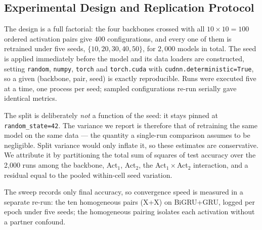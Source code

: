 \documentclass[conference,a4paper]{IEEEtran}
\begin{document}
\subsection{Experimental Design and Replication Protocol}
\label{sec:replication}

The design is a full factorial: the four backbones crossed with
all $10\times10 = 100$ ordered activation pairs give $400$
configurations, and every one of them is retrained under five
seeds, $\{10,20,30,40,50\}$, for $2{,}000$ models in total. The
seed is applied immediately before the model and its data
loaders are constructed, setting \texttt{random}, \texttt{numpy},
\texttt{torch} and \texttt{torch.cuda} with
\texttt{cudnn.deterministic=True}, so a given (backbone, pair,
seed) is exactly reproducible. Runs were executed five at a
time, one process per seed; sampled configurations re-run
serially gave identical metrics.

The split is deliberately \emph{not} a function of the seed: it
stays pinned at \texttt{random\_state=42}. The variance we report
is therefore that of retraining the same model on the same
data --- the quantity a single-run comparison assumes to be
negligible. Split variance would only inflate it, so these
estimates are conservative. We attribute it by partitioning the
total sum of squares of test accuracy over the 2{,}000 runs among
the backbone, Act$_1$, Act$_2$, the Act$_1\times$Act$_2$
interaction, and a residual equal to the pooled within-cell
seed variation.

The sweep records only final accuracy, so convergence speed is
measured in a separate re-run: the ten homogeneous pairs (X+X)
on BiGRU+GRU, logged per epoch under five seeds; the homogeneous
pairing isolates each activation without a partner confound.
\end{document}

